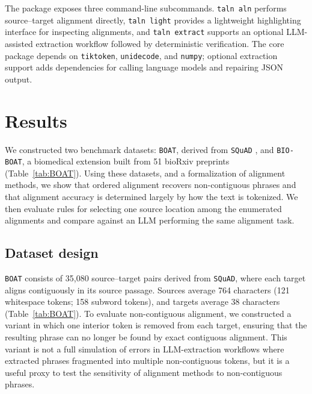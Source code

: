 \documentclass[pdflatex,lineno,referee,sn-vancouver-num]{sn-jnl}
\theoremstyle{thmstyleone}
\theoremstyle{thmstylethree}
\theoremstyle{thmstyletwo}
\begin{document}
The package exposes three command-line subcommands. \texttt{taln aln} performs source--target alignment directly, \texttt{taln light} provides a lightweight highlighting interface for inspecting alignments, and \texttt{taln extract} supports an optional LLM-assisted extraction workflow followed by deterministic verification. The core package depends on \texttt{tiktoken}, \texttt{unidecode}, and \texttt{numpy}; optional extraction support adds dependencies for calling language models and repairing JSON output.

\section{Results}
We constructed two benchmark datasets: \texttt{BOAT}, derived from \texttt{SQuAD} \citep{rajpurkar2016squad100000questionsmachine, rajpurkar2018knowdontknowunanswerable}, and \texttt{BIO-BOAT}, a biomedical extension built from 51 bioRxiv preprints (Table~\ref{tab:BOAT}). Using these datasets, and a formalization of alignment methods, we show that ordered alignment recovers non-contiguous phrases and that alignment accuracy is determined largely by how the text is tokenized. We then evaluate rules for selecting one source location among the enumerated alignments and compare against an LLM performing the same alignment task.

\subsection{Dataset design}
\texttt{BOAT} consists of 35{,}080 source–target pairs derived from \texttt{SQuAD}, where each target aligns contiguously in its source passage. Sources average 764 characters (121 whitespace tokens; 158 subword tokens), and targets average 38 characters (Table~\ref{tab:BOAT}). To evaluate non-contiguous alignment, we constructed a variant in which one interior token is removed from each target, ensuring that the resulting phrase can no longer be found by exact contiguous alignment. This variant is not a full simulation of errors in LLM-extraction workflows where extracted phrases fragmented into multiple non-contiguous tokens, but it is a useful proxy to test the sensitivity of alignment methods to non-contiguous phrases.
\end{document}
